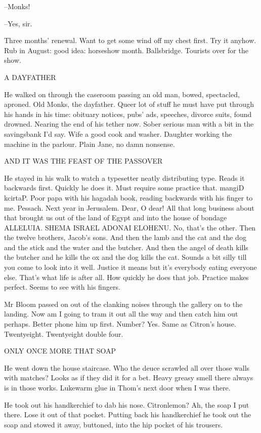 --Monks!

--Yes, sir.

Three months' renewal. Want to get some wind off my chest first. Try
it anyhow. Rub in August: good idea: horseshow month. Ballsbridge.
Tourists over for the show.


    A DAYFATHER


He walked on through the caseroom passing an old man, bowed,
spectacled, aproned. Old Monks, the dayfather. Queer lot of stuff he must
have put through his hands in his time: obituary notices, pubs' ads,
speeches, divorce suits, found drowned. Nearing the end of his tether now.
Sober serious man with a bit in the savingsbank I'd say. Wife a good cook
and washer. Daughter working the machine in the parlour. Plain Jane, no
damn nonsense.


    AND IT WAS THE FEAST OF THE PASSOVER


He stayed in his walk to watch a typesetter neatly distributing type.
Reads it backwards first. Quickly he does it. Must require some practice
that. mangiD kcirtaP. Poor papa with his hagadah book, reading
backwards with his finger to me. Pessach. Next year in Jerusalem. Dear, O
dear! All that long business about that brought us out of the land of
Egypt and into the house of bondage ALLELUIA. SHEMA ISRAEL ADONAI ELOHENU.
No, that's the other. Then the twelve brothers, Jacob's sons. And then the
lamb and the cat and the dog and the stick and the water and the butcher.
And then the angel of death kills the butcher and he kills the ox and the
dog kills the cat. Sounds a bit silly till you come to look into it well.
Justice it means but it's everybody eating everyone else. That's what life
is after all. How quickly he does that job. Practice makes perfect. Seems
to see with his fingers.

Mr Bloom passed on out of the clanking noises through the gallery on
to the landing. Now am I going to tram it out all the way and then catch
him out perhaps. Better phone him up first. Number? Yes. Same as Citron's
house. Twentyeight. Twentyeight double four.


    ONLY ONCE MORE THAT SOAP


He went down the house staircase. Who the deuce scrawled all over
those walls with matches? Looks as if they did it for a bet. Heavy greasy
smell there always is in those works. Lukewarm glue in Thom's next door
when I was there.

He took out his handkerchief to dab his nose. Citronlemon? Ah, the
soap I put there. Lose it out of that pocket. Putting back his
handkerchief he took out the soap and stowed it away, buttoned, into the
hip pocket of his trousers.

